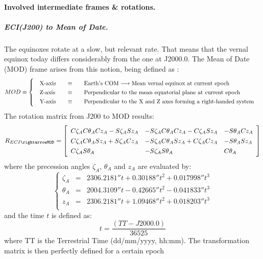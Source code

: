 		\paragraph{Involved intermediate frames \& rotations. \\}
		\subparagraph{ECI(J200) to Mean of Date. \\}
		\indent The equinoxes rotate at a slow, but relevant rate. That means that the vernal equinox today differs considerably from the one at J2000.0. The Mean of Date (MOD) frame arises from this notion, being defined as \cite{Tapley}: \\
		\[
		\arraycolsep=10pt
		\def\arraystretch{1.3}
		MOD\equiv\left\{
		\begin{array}{lll}
		\text{X-axis} 	& \equiv 	& \text{Earth's COM} \longrightarrow \text{Mean vernal equinox at current epoch} \\
		\text{Z-axis} 	& \equiv 	& \text{Perpendicular to the mean equatorial plane at current epoch} \\
		\text{Y-axis} 	& \equiv 	& \text{Perpendicular to the X and Z axes forming a right-handed system} \\
		\end{array}
		\right.
		\]
		\indent The rotation matrix from J200 to MOD results:
		\begin{equation}
		R_{ECI\rightarrowMOD} = 
		\left[ 
		\begin{array}{lll}
		C \zeta_A C \theta_A C z_A - S \zeta_A S z_A 	& - S \zeta_A C \theta_A C z_A - C \zeta_A S z_A 	& -S \theta_A C z_A \\
		C \zeta_A C \theta_A S z_A + S \zeta_A C z_A 	& - S \zeta_A C \theta_A S z_A + C \zeta_A C z_A 	& -S \theta_A S z_A \\
 		C \zeta_A S \theta_A 							& - S \zeta_A S \theta_A 							& C \theta_A
		\end{array}
		\right]
		\label{eq: R_ECI_MOD}
		\end{equation}
		\noindent where the precession angles $\zeta_A$, $\theta_A$ and $z_A$ are evaluated by:
		\[
		\left\{ 
		\begin{array}{lll}
		\zeta_A 	& = & 2306.2181'' t + 0.30188'' t^2 + 0.017998'' t^3 \\
		\theta_A 	& =	& 2004.3109'' t - 0.42665'' t^2 - 0.041833'' t^3 \\
		z_A 		& =	& 2306.2181'' t + 1.09468'' t^2 + 0.018203'' t^3 \\ 
		\end{array}
		\right.
		\]
		\nonindent and the time $t$ is defined as:
		\[
		t 	= \dfrac{\left(TT - J2000.0\right)}{36525}		
		\]
		\nonindent where TT is the Terrestrial Time (dd/mm/yyyy, hh:mm). The transformation matrix is then perfectly defined for a certain epoch
		
